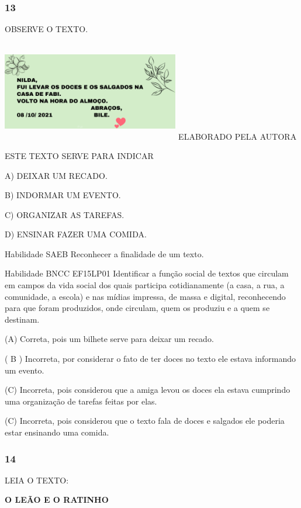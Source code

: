 \subsubsection{13 }\label{section-53}

OBSERVE O TEXTO.

\includegraphics[width=3.04633in,height=1.71374in]{media/image220.png}
ELABORADO PELA AUTORA

ESTE TEXTO SERVE PARA INDICAR

A) DEIXAR UM RECADO.

B) INDORMAR UM EVENTO.

C) ORGANIZAR AS TAREFAS.

D) ENSINAR FAZER UMA COMIDA.

Habilidade SAEB Reconhecer a finalidade de um texto.

Habilidade BNCC EF15LP01 Identificar a função social de textos que
circulam em campos da vida social dos quais participa cotidianamente (a
casa, a rua, a comunidade, a escola) e nas mídias impressa, de massa e
digital, reconhecendo para que foram produzidos, onde circulam, quem os
produziu e a quem se destinam.

(A) Correta, pois um bilhete serve para deixar um recado.

( B ) Incorreta, por considerar o fato de ter doces no texto ele estava
informando um evento.

(C) Incorreta, pois considerou que a amiga levou os doces ela estava
cumprindo uma organização de tarefas feitas por elas.

(C) Incorreta, pois considerou que o texto fala de doces e salgados ele
poderia estar ensinando uma
comida.\protect\hypertarget{_heading=h.xdbqd2s8fd2q}{}{}

\subsubsection{14}\label{section-54}

LEIA O TEXTO:

\textbf{O LEÃO E O RATINHO}

